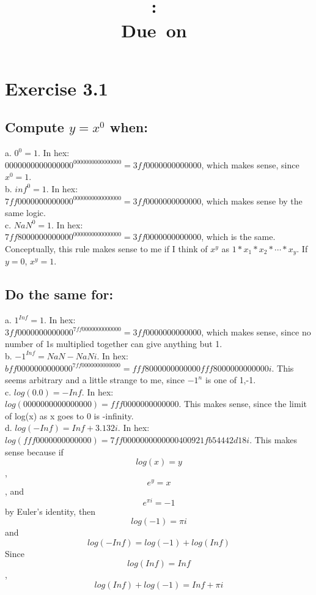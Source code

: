 \documentclass[11pt]{modart}
\title{\large{\hmwkAuthorName}\vspace{0.1in}\\\textmd{\textbf{\hmwkClass:\ \hmwkTitle}}\\\normalsize\vspace{0.1in}\small{Due\ on\ \hmwkDueDate}\\\vspace{0.1in}\large{\textit{\hmwkClassInstructor}}\vspace{0.5in}}
\author{}
\date{}
\begin{document}
\maketitle

\section{Exercise 3.1}
\subsection{Compute $y= x^0$ when:}
a. $0^0=1$.  In hex:\\
$0000000000000000^{0000000000000000} = 3ff0000000000000$, which makes sense, since $x^0 = 1$.\\
b. $inf^0 = 1$. In hex:\\
$7ff0000000000000^{0000000000000000} = 3ff0000000000000$, which makes sense by the same logic.\\
c. $NaN^0 = 1$. In hex:\\
$7ff8000000000000^{0000000000000000} = 3ff0000000000000$, which is the same.\\
Conceptually, this rule makes sense to me if I think of $x^y$ as $1*x_1*x_2*\cdots*x_{y}$.  If $y=0$, $x^y=1$.
\subsection{Do the same for:}
a. $1^{Inf}=1$.  In hex:\\
$3ff0000000000000^{7ff0000000000000} = 3ff0000000000000$,
 which makes sense, since no number of 1s multiplied together can give anything but 1.\\

b. $-1^{Inf}=NaN - NaNi$.  In hex:\\
$bff0000000000000^{7ff0000000000000} = fff8000000000000  fff8000000000000i$. 
 This seems arbitrary and a little strange to me, since $-1^n$ is one of {1,-1}.\\

c. $log(0.0)=-Inf$.  In hex:\\
$log(0000000000000000)=fff0000000000000$.  This makes sense, since the limit of log(x) as x goes to 0 is -infinity.\\

d. $log(-Inf)=Inf + 3.132i$.  In hex:\\
$log(fff0000000000000)=7ff0000000000000  400921fb54442d18i$.
This makes sense because if $$log(x)=y$$, $$e^y = x$$, and $$e^{\pi i}=-1$$ by Euler's identity, then $$log(-1)=\pi i$$
and $$log(-Inf)=log(-1) + log(Inf)$$
Since $$log(Inf)=Inf$$, $$log(Inf) + log(-1) = Inf + \pi i$$
\end{document}

